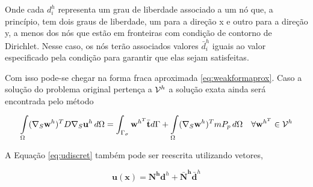 Onde cada $d_i^h$ representa um grau de liberdade associado a um nó que, a princípio,  tem dois graus de liberdade, um para a direção x e outro para a direção y, a menos dos nós que estão em fronteiras com condição de contorno de Dirichlet. Nesse caso, os nós terão associados valores $\bar{d}_i^h$  iguais ao valor especificado pela condição para garantir que elas sejam satisfeitas.


Com isso pode-se chegar na forma fraca aproximada \eqref{eq:weakformaprox}. Caso a solução do problema original pertença a $\mathcal{V}^h$ a solução exata ainda será encontrada pelo método

\begin{equation}\label{eq:weakformaprox}
\int\limits_{\Omega}  (\nabla_S \mathbf{w}^h)^T D \nabla_S  \mathbf{u}^h \, d\Omega  =  \int_{\Gamma_\sigma} \mathbf{w}^{h^T} \bar{\mathbf{t}} d\Gamma  +  \int\limits_{\Omega} (\nabla_S\mathbf{w}^h)^T m P_p \, d\Omega  \quad \forall \mathbf{w}^{h^T} \in \mathcal{V}^h
\end{equation}




A Equação \eqref{eq:udiscret} também pode ser reescrita utilizando vetores,

\begin{equation}\label{eq:udiscretvetor}
\mathbf{u}(\mathbf{x}) = \mathbf{N^h} \mathbf{d}^h + \mathbf{\bar{N}^h} \mathbf{\bar{d}}^h
\end{equation}

